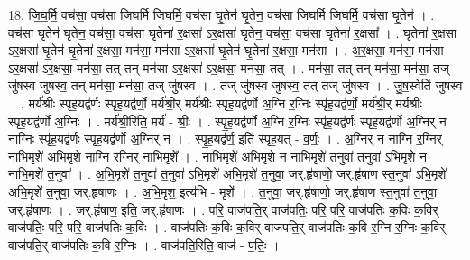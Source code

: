 \documentclass[17pt]{extarticle}
\begin{document}
18. जि॒घ॒र्मि॒ वच॑सा॒ वच॑सा जिघर्मि जिघर्मि॒ वच॑सा घृ॒तेन॑ घृ॒तेन॒ वच॑सा जिघर्मि जिघर्मि॒ वच॑सा घृ॒तेन॑ । . वच॑सा घृ॒तेन॑ घृ॒तेन॒ वच॑सा॒ वच॑सा घृ॒तेना॑ र॒क्षसा॑ ऽर॒क्षसा॑ घृ॒तेन॒ वच॑सा॒ वच॑सा घृ॒तेना॑ र॒क्षसा᳚ । . घृ॒तेना॑ र॒क्षसा॑ ऽर॒क्षसा॑ घृ॒तेन॑ घृ॒तेना॑ र॒क्षसा॒ मन॑सा॒ मन॑सा ऽर॒क्षसा॑ घृ॒तेन॑ घृ॒तेना॑ र॒क्षसा॒ मन॑सा । . अ॒र॒क्षसा॒ मन॑सा॒ मन॑सा ऽर॒क्षसा॑ ऽर॒क्षसा॒ मन॑सा॒ तत् तन् मन॑सा ऽर॒क्षसा॑ ऽर॒क्षसा॒ मन॑सा॒ तत् । . मन॑सा॒ तत् तन् मन॑सा॒ मन॑सा॒ तज् जु॑षस्व जुषस्व॒ तन् मन॑सा॒ मन॑सा॒ तज् जु॑षस्व । . तज् जु॑षस्व जुषस्व॒ तत् तज् जु॑षस्व । . जु॒ष॒स्वेति॑ जुषस्व । . मर्य॑श्रीः स्पृह॒यद्व॑र्णः स्पृह॒यद्व॑र्णो॒ मर्य॑श्री॒र् मर्य॑श्रीः स्पृह॒यद्व॑र्णो अ॒ग्नि र॒ग्निः स्पृ॑ह॒यद्व॑र्णो॒ मर्य॑श्री॒र् मर्य॑श्रीः स्पृह॒यद्व॑र्णो अ॒ग्निः । . मर्य॑श्री॒रिति॒ मर्य॑ - श्रीः॒ । . स्पृ॒ह॒यद्व॑र्णो अ॒ग्नि र॒ग्निः स्पृ॑ह॒यद्व॑र्णः स्पृह॒यद्व॑र्णो अ॒ग्निर् न नाग्निः स्पृ॑ह॒यद्व॑र्णः स्पृह॒यद्व॑र्णो अ॒ग्निर् न । . स्पृ॒ह॒यद्व॑र्ण॒ इति॑ स्पृह॒यत् - व॒र्णः॒ । . अ॒ग्निर् न नाग्नि र॒ग्निर् नाभि॒मृशे॑ अभि॒मृशे॒ नाग्नि र॒ग्निर् नाभि॒मृशे᳚ । . नाभि॒मृशे॑ अभि॒मृशे॒ न नाभि॒मृशे॑ त॒नुवा॑ त॒नुवा॑ ऽभि॒मृशे॒ न नाभि॒मृशे॑ त॒नुवा᳚ । . अ॒भि॒मृशे॑ त॒नुवा॑ त॒नुवा॑ ऽभि॒मृशे॑ अभि॒मृशे॑ त॒नुवा॒ जर्.हृ॑षाणो॒ जर्.हृ॑षाण स्त॒नुवा॑ ऽभि॒मृशे॑ अभि॒मृशे॑ त॒नुवा॒ जर्.हृ॑षाणः । . अ॒भि॒मृश॒ इत्य॑भि - मृशे᳚ । . त॒नुवा॒ जर्.हृ॑षाणो॒ जर्.हृ॑षाण स्त॒नुवा॑ त॒नुवा॒ जर्.हृ॑षाणः । . जर्.हृ॑षाण॒ इति॒ जर्.हृ॑षाणः । . परि॒ वाज॑पति॒र् वाज॑पतिः॒ परि॒ परि॒ वाज॑पतिः क॒विः क॒विर् वाज॑पतिः॒ परि॒ परि॒ वाज॑पतिः क॒विः । . वाज॑पतिः क॒विः क॒विर् वाज॑पति॒र् वाज॑पतिः क॒वि र॒ग्नि र॒ग्निः क॒विर् वाज॑पति॒र् वाज॑पतिः क॒वि र॒ग्निः । . वाज॑पति॒रिति॒ वाज॑ - प॒तिः॒ । \newline
\end{document}
